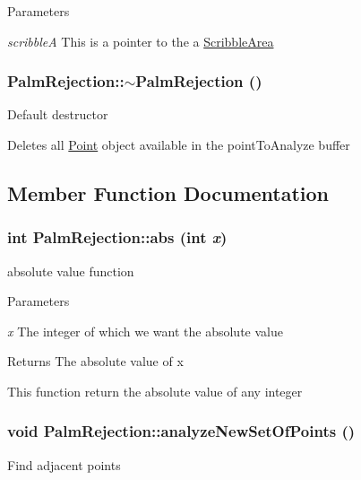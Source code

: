 \begin{DoxyParams}{Parameters}
\item[{\em scribbleA}]This is a pointer to the a \hyperlink{classScribbleArea}{ScribbleArea} \end{DoxyParams}
\hypertarget{classPalmRejection_a0ae1ed25302f025d6239d77c6c7ffacb}{
\subsubsection[{$\sim$PalmRejection}]{\setlength{\rightskip}{0pt plus 5cm}PalmRejection::$\sim$PalmRejection ()}}
\label{classPalmRejection_a0ae1ed25302f025d6239d77c6c7ffacb}
Default destructor

Deletes all \hyperlink{classPoint}{Point} object available in the pointToAnalyze buffer 

\subsection{Member Function Documentation}
\hypertarget{classPalmRejection_a3e2b4d2e26c56ac504847096b9b991c6}{
\subsubsection[{abs}]{\setlength{\rightskip}{0pt plus 5cm}int PalmRejection::abs (int {\em x})}}
\label{classPalmRejection_a3e2b4d2e26c56ac504847096b9b991c6}
absolute value function


\begin{DoxyParams}{Parameters}
\item[{\em x}]The integer of which we want the absolute value\end{DoxyParams}
\begin{DoxyReturn}{Returns}
The absolute value of x
\end{DoxyReturn}
This function return the absolute value of any integer \hypertarget{classPalmRejection_a2e56fb3aab93650900ab7ba4f14e6507}{
\subsubsection[{analyzeNewSetOfPoints}]{\setlength{\rightskip}{0pt plus 5cm}void PalmRejection::analyzeNewSetOfPoints ()}}
\label{classPalmRejection_a2e56fb3aab93650900ab7ba4f14e6507}
Find adjacent points

